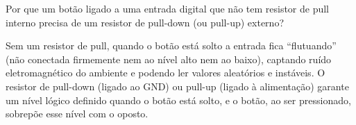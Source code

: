 \question[3] Por que um botão ligado a uma entrada digital que não tem resistor de pull interno precisa de um resistor de pull-down (ou pull-up) externo?

\begin{solution}
Sem um resistor de pull, quando o botão está solto a entrada fica ``flutuando'' (não conectada firmemente nem ao nível alto nem ao baixo), captando ruído eletromagnético do ambiente e podendo ler valores aleatórios e instáveis. O resistor de pull-down (ligado ao GND) ou pull-up (ligado à alimentação) garante um nível lógico definido quando o botão está solto, e o botão, ao ser pressionado, sobrepõe esse nível com o oposto.
\end{solution}
